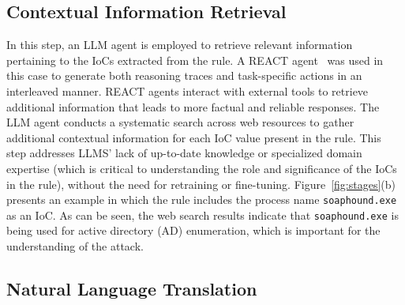 \subsection{Contextual Information Retrieval}
In this step, an LLM agent is employed to retrieve relevant information pertaining to the IoCs extracted from the rule.
A REACT agent~\cite{react} was used in this case to generate both reasoning traces and task-specific actions in an interleaved manner.
REACT agents interact with external tools to retrieve additional information that leads to more factual and reliable responses.
The LLM agent conducts a systematic search across web resources to gather additional contextual information for each IoC value present in the rule. 
This step addresses LLMS' lack of up-to-date knowledge or specialized domain expertise (which is critical to understanding the role and significance of the IoCs in the rule), without the need for retraining or fine-tuning.
Figure~\ref{fig:stages}(b) presents an example in which the rule includes the process name \texttt{soaphound.exe} as an IoC.
As can be seen, the web search results indicate that \texttt{soaphound.exe} is being used for active directory (AD) enumeration, which is important for the understanding of the attack. 

\subsection{Natural Language Translation}

